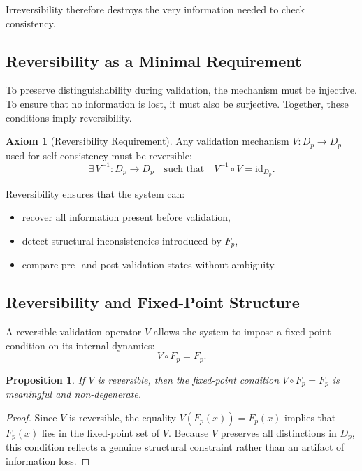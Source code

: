 \documentclass[11pt]{article}
\theoremstyle{definition}
\newtheorem{axiom}{Axiom}[section]
\theoremstyle{plain}
\newtheorem{proposition}[definition]{Proposition}
\theoremstyle{remark}
\begin{document}
Irreversibility therefore destroys the very information needed to check
consistency.

\subsection{Reversibility as a Minimal Requirement}

To preserve distinguishability during validation, the mechanism must be
injective. To ensure that no information is lost, it must also be
surjective. Together, these conditions imply reversibility.

\begin{axiom}[Reversibility Requirement]
Any validation mechanism $V : D_p \to D_p$ used for self-consistency
must be reversible:
\[
\exists\, V^{-1} : D_p \to D_p \quad \text{such that} \quad
V^{-1} \circ V = \mathrm{id}_{D_p}.
\]
\end{axiom}

Reversibility ensures that the system can:

\begin{itemize}
    \item recover all information present before validation,
    \item detect structural inconsistencies introduced by $F_p$,
    \item compare pre- and post-validation states without ambiguity.
\end{itemize}

\subsection{Reversibility and Fixed-Point Structure}

A reversible validation operator $V$ allows the system to impose a
fixed-point condition on its internal dynamics:
\[
V \circ F_p = F_p.
\]

\begin{proposition}
If $V$ is reversible, then the fixed-point condition
$V \circ F_p = F_p$ is meaningful and non-degenerate.
\end{proposition}

\begin{proof}
Since $V$ is reversible, the equality
$V(F_p(x)) = F_p(x)$
implies that $F_p(x)$ lies in the fixed-point set of $V$. Because $V$
preserves all distinctions in $D_p$, this condition reflects a genuine
structural constraint rather than an artifact of information loss.
\end{proof}
\end{document}
